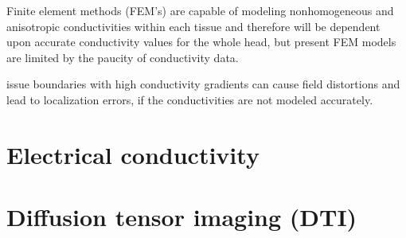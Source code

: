 Finite element methods (FEM's) are capable of modeling nonhomogeneous and anisotropic conductivities within each tissue and therefore will be dependent upon accurate conductivity values for the whole head, but present FEM models are limited by the paucity of conductivity data.

issue boundaries with high conductivity gradients can cause field distortions and lead to localization errors, if the conductivities are not modeled accurately.


\section{Electrical conductivity}

\section{Diffusion tensor imaging (DTI)}


